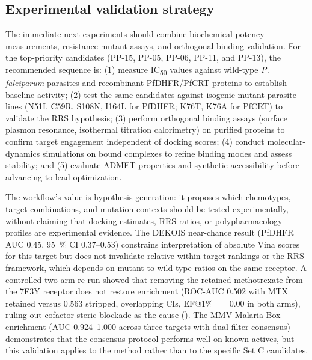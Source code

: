 \documentclass[journal=jcisd8,manuscript=article]{achemso}
\begin{document}
\subsection{Experimental validation strategy}\label{sec:disc_validation}
The immediate next experiments should combine biochemical potency measurements, resistance-mutant assays, and orthogonal binding validation. For the top-priority candidates (PP-15, PP-05, PP-06, PP-11, and PP-13), the recommended sequence is: (1) measure IC\textsubscript{50} values against wild-type \emph{P. falciparum} parasites and recombinant PfDHFR/PfCRT proteins to establish baseline activity; (2) test the same candidates against isogenic mutant parasite lines (N51I, C59R, S108N, I164L for PfDHFR; K76T, K76A for PfCRT) to validate the RRS hypothesis; (3) perform orthogonal binding assays (surface plasmon resonance, isothermal titration calorimetry) on purified proteins to confirm target engagement independent of docking scores; (4) conduct molecular-dynamics simulations on bound complexes to refine binding modes and assess stability; and (5) evaluate ADMET properties and synthetic accessibility before advancing to lead optimization.

The workflow's value is hypothesis generation: it proposes which chemotypes, target combinations, and mutation contexts should be tested experimentally, without claiming that docking estimates, RRS ratios, or polypharmacology profiles are experimental evidence. The DEKOIS near-chance result (PfDHFR AUC \num{0.45}, \qty{95}{\percent} CI \numrange{0.37}{0.53}) constrains interpretation of absolute Vina scores for this target but does not invalidate relative within-target rankings or the RRS framework, which depends on mutant-to-wild-type ratios on the same receptor. A controlled two-arm re-run showed that removing the retained methotrexate from the 7F3Y receptor does not restore enrichment (ROC-AUC \num{0.502} with MTX retained versus \num{0.563} stripped, overlapping CIs, EF@1\% $=$ \num{0.00} in both arms), ruling out cofactor steric blockade as the cause (). The MMV Malaria Box enrichment (AUC \numrange{0.924}{1.000} across three targets with dual-filter consensus) demonstrates that the consensus protocol performs well on known actives, but this validation applies to the method rather than to the specific Set C candidates.
\end{document}
